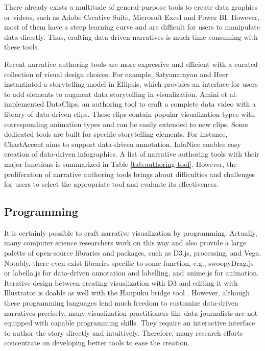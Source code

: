 There already exists a multitude of general-purpose tools to create data graphics or videos, such as Adobe Creative Suite, Microsoft Excel and Power BI. However, most of them have a steep learning curve and are difficult for users to manipulate data directly. Thus, crafting data-driven narratives is much time-consuming with these tools. 

Recent narrative authoring tools \cite{Amini2017, Satyanarayan2014} are more expressive and efficient with a curated collection of visual design choices. For example, Satyanarayan and Heer \cite{Satyanarayan2014} instantiated a storytelling model in Ellipsis, which provides an interface for users to add elements to augment data storytelling in visualization. Amini et al. \cite{Amini2017} implemented DataClips, an authoring tool to craft a complete data video with a library of data-driven clips. These clips contain popular visualization types with corresponding animation types and can be easily extended to new clips. Some dedicated tools are built for specific storytelling elements. For instance, ChartAccent \cite{Ren2017} aims to support data-driven annotation. InfoNice \cite{Wang2018} enables easy creation of data-driven infographics. A list of narrative authoring tools with their major functions is summarized in Table \ref{tab:authoring-tool}. However, the proliferation of narrative authoring tools brings about difficulties and challenges for users to select the appropriate tool and evaluate its effectiveness. 

\subsection{Programming}

It is certainly possible to craft narrative visualization by programming. Actually, many computer science researchers work on this way and also provide a large palette of open-source libraries and packages, such as D3.js, processing, and Vega. Notably, there even exist libraries specific to some function, e.g., swoopyDrag.js or labella.js for data-driven annotation and labelling, and anime.js for animation. Iterative design between creating visualization with D3 and editing it with Illustrator is doable as well with the Hanpuku bridge tool \cite{Bigelow2017}. However, although these programming languages lend much freedom to customize data-driven narratives precisely, many visualization practitioners like data journalists are not equipped with capable programming skills. They require an interactive interface to author the story directly and intuitively. Therefore, many research efforts concentrate on developing better tools to ease the creation.

